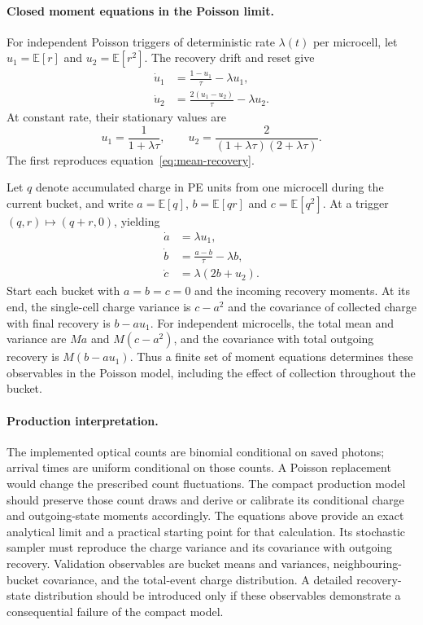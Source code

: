 \documentclass[11pt]{article}
\newcommand{\E}{\mathbb{E}}
\begin{document}
\paragraph{Closed moment equations in the Poisson limit.}
For independent Poisson triggers of deterministic rate $\lambda(t)$ per
microcell, let $u_1=\E[r]$ and $u_2=\E[r^2]$. The recovery drift and reset give
\begin{align}
 \dot u_1&=\frac{1-u_1}{\tau}-\lambda u_1,\\
 \dot u_2&=\frac{2(u_1-u_2)}{\tau}-\lambda u_2.
 \label{eq:recovery-moments}
\end{align}
At constant rate, their stationary values are
\begin{equation}
 u_1=\frac{1}{1+\lambda\tau},\qquad
 u_2=\frac{2}{(1+\lambda\tau)(2+\lambda\tau)}.
\end{equation}
The first reproduces equation~\eqref{eq:mean-recovery}.

Let $q$ denote accumulated charge in PE units from one microcell during the
current bucket, and write $a=\E[q]$, $b=\E[qr]$ and $c=\E[q^2]$.
At a trigger $(q,r)\mapsto(q+r,0)$, yielding
\begin{align}
 \dot a&=\lambda u_1,\\
 \dot b&=\frac{a-b}{\tau}-\lambda b,\\
 \dot c&=\lambda(2b+u_2).
 \label{eq:charge-state-moments}
\end{align}
Start each bucket with $a=b=c=0$ and the incoming recovery moments.
At its end, the single-cell charge variance is $c-a^2$ and the covariance
of collected charge with final recovery is $b-a u_1$. For independent
microcells, the total mean and variance are $Ma$ and $M(c-a^2)$, and the
covariance with total outgoing recovery is $M(b-a u_1)$.
Thus a finite set of moment equations determines these observables in the
Poisson model, including the effect of collection throughout the bucket.

\paragraph{Production interpretation.}
The implemented optical counts are binomial conditional on saved photons;
arrival times are uniform conditional on those counts. A Poisson replacement
would change the prescribed count fluctuations. The compact production model
should preserve those count draws and derive or calibrate its conditional
charge and outgoing-state moments accordingly. The equations above provide
an exact analytical limit and a practical starting point for that calculation.
Its stochastic sampler must reproduce the charge variance and its covariance
with outgoing recovery. Validation observables are bucket means and variances,
neighbouring-bucket covariance, and the total-event charge distribution.
A detailed recovery-state distribution should be introduced only if these
observables demonstrate a consequential failure of the compact model.
\end{document}
